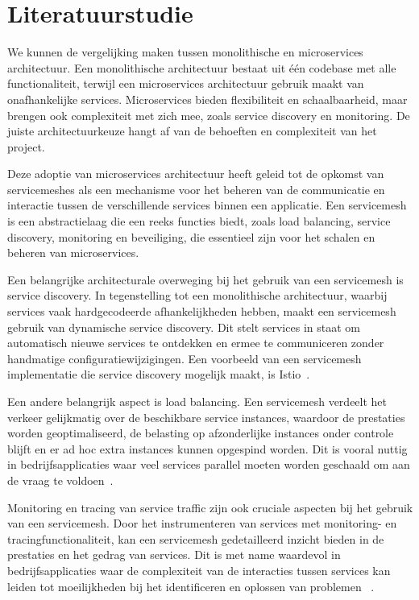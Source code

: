 \documentclass{hogent-article}
\begin{document}
\section{Literatuurstudie}%
\label{sec:literatuurstudie}


We kunnen de vergelijking maken  tussen monolithische en microservices architectuur. Een monolithische architectuur bestaat uit één codebase met alle functionaliteit, terwijl een \linebreak microservices architectuur gebruik maakt van onafhankelijke services. Microservices bieden flexibiliteit en schaalbaarheid, maar brengen ook complexiteit met zich mee, zoals service discovery en monitoring. De juiste architectuurkeuze hangt af van de behoeften en complexiteit van het project.

Deze adoptie van microservices architectuur heeft geleid tot de opkomst van servicemeshes als een mechanisme voor het beheren van de communicatie en interactie tussen de verschillende services binnen een applicatie. Een servicemesh is een abstractielaag die een reeks functies biedt, zoals load balancing, service discovery, monitoring en beveiliging, die essentieel zijn voor het schalen en beheren van microservices.

Een belangrijke architecturale overweging bij het gebruik van een servicemesh is service discovery. In tegenstelling tot een monolithische architectuur, waarbij services vaak hardgecodeerde afhankelijkheden hebben, maakt een servicemesh gebruik van dynamische service discovery. Dit stelt services in staat om automatisch nieuwe services te ontdekken en ermee te communiceren zonder handmatige configuratiewijzigingen. Een voorbeeld van een servicemesh implementatie die service discovery mogelijk maakt, is Istio\linebreak~\autocite{Morgan2021}.

Een andere belangrijk aspect is load balancing. Een servicemesh verdeelt het verkeer gelijkmatig over de beschikbare service instances, waardoor de prestaties worden geoptimaliseerd, de belasting op afzonderlijke instances onder controle blijft en er ad hoc extra instances kunnen opgespind worden. Dit is vooral nuttig in bedrijfsapplicaties waar veel services parallel moeten worden geschaald om aan de vraag te voldoen~\autocite{Ciobotaru2020}.

Monitoring en tracing van service traffic zijn ook cruciale aspecten bij het gebruik van een servicemesh. Door het instrumenteren van services met monitoring- en tracingfunctionaliteit, kan een servicemesh gedetailleerd inzicht bieden in de prestaties en het gedrag van services. Dit is met name waardevol in bedrijfsapplicaties waar de complexiteit van de interacties tussen services kan leiden tot moeilijkheden bij het identificeren en oplossen van problemen \linebreak ~\autocite{Ciobotaru2021}.
\end{document}

